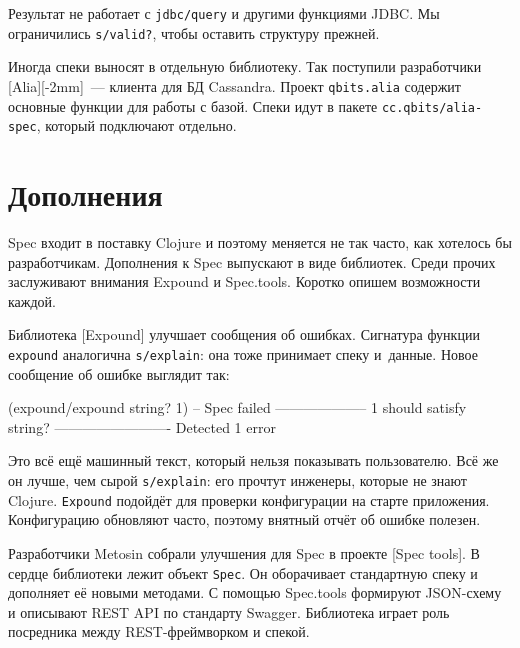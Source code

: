 Результат не работает с \verb|jdbc/query| и другими функциями JDBC. Мы
ограничились \verb|s/valid?|, чтобы оставить структуру прежней.

Иногда спеки выносят в отдельную библиотеку. Так поступили разработчики
[Alia][-2mm]~--- клиента для БД
Cassandra. Проект \verb|qbits.alia| содержит основные функции для работы с
базой. Спеки идут в пакете \verb|cc.qbits/alia-spec|, который подключают
отдельно.

\section{Дополнения}

Spec входит в поставку Clojure и поэтому меняется не так часто, как хотелось бы
разработчикам. Дополнения к Spec выпускают в виде библиотек. Среди прочих
заслуживают внимания Expound и Spec.tools. Коротко опишем возможности каждой.


Библиотека [Expound] улучшает сообщения об
ошибках. Сигнатура функции \verb|expound| аналогична \verb|s/explain|: она
тоже принимает спеку и~данные. Новое сообщение об ошибке выглядит так:


\begin{english}
  \begin{clojure}
(expound/expound string? 1)
-- Spec failed --------------------
  1
should satisfy
  string?
-------------------------
Detected 1 error
  \end{clojure}
\end{english}


Это всё ещё машинный текст, который нельзя показывать пользователю. Всё же
он лучше, чем сырой \verb|s/explain|: его прочтут инженеры, которые не знают
Clojure. \verb|Expound| подойдёт для проверки конфигурации на старте
приложения. Конфигурацию обновляют часто, поэтому внятный отчёт об ошибке
полезен.


Разработчики Metosin собрали улучшения для Spec в проекте
[Spec tools]. В сердце библиотеки
лежит объект \verb|Spec|. Он оборачивает стандартную спеку и дополняет её
новыми методами. С помощью Spec.tools формируют JSON-схему и описывают REST
API по стандарту Swagger. Библиотека играет роль посредника между
REST-фреймворком и спекой.

